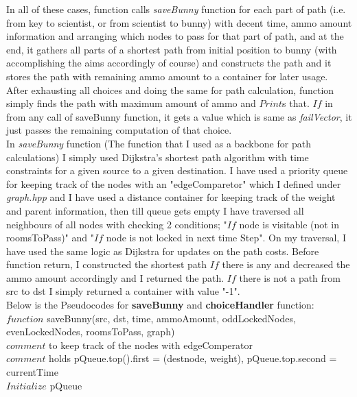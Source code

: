 \documentclass[10pt]{article}
\begin{document}
In all of these cases, function calls \textit{saveBunny} function for each part of path (i.e. from key to scientist, or from scientist to bunny) with decent time, ammo amount information and arranging which nodes to pass for that part of path, and at the end, it gathers all parts of a shortest path from initial position to bunny (with accomplishing the aims accordingly of course) and constructs the path and it stores the path with remaining ammo amount to a container for later usage. After exhausting all choices and doing the same for path calculation, function simply finds the path with maximum amount of ammo and $Print$s that. $If$ in from any call of saveBunny function, it gets a value which is same as \textit{failVector}, it just passes the remaining computation of that choice. \\

In \textit{saveBunny} function (The function that I used as a backbone for path calculations) I simply used Dijkstra's shortest path algorithm with time constraints for a given source to a given destination. I have used a priority queue for keeping track of the nodes with an "edgeComparetor" which I defined under \textit{graph.hpp} and I have used a distance container for keeping track of the weight and parent information, then till queue gets empty I have traversed all neighbours of all nodes with checking 2 conditions; "$If$ node is visitable (not in roomsToPass)" and "$If$ node is not locked in next time Step". On my traversal, I have used the same logic as Dijkstra for updates on the path costs. Before function return, I constructed the shortest path $If$ there is any and decreased the ammo amount accordingly and I returned the path. $If$ there is not a path from src to dst I simply returned a container with value "-1". \\

Below is the Pseudocodes for \textbf{saveBunny} and \textbf{choiceHandler} function: \\

$function$ saveBunny(src, dst, time, ammoAmount, oddLockedNodes, evenLockedNodes, roomsToPass, graph) \\

	$comment$ to keep track of the nodes with edgeComperator \\
	$comment$ holds pQueue.top().first = (destnode, weight), pQueue.top.second = currentTime  \\
	$Initialize$ pQueue  \\ \\
\end{document}
